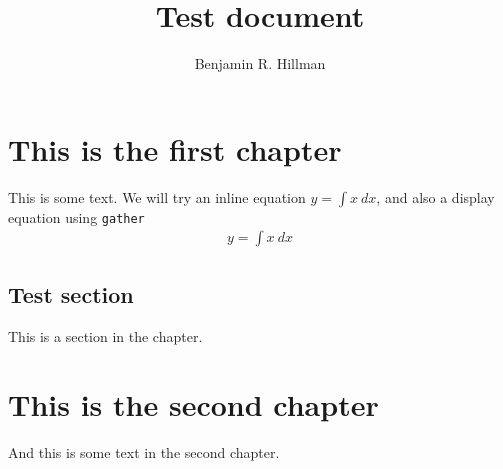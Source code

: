 \documentclass[12pt]{report}
\author{Benjamin R. Hillman}
\title{Test document}
\begin{document}
\maketitle

\chapter{This is the first chapter}
This is some text. We will try an inline equation $y = \int x ~dx$, and also a
display equation using \texttt{gather}
\begin{gather}
    y = \int x ~dx
\end{gather}
\section{Test section}
This is a section in the chapter.

\chapter{This is the second chapter}
And this is some text in the second chapter.
\end{document}
